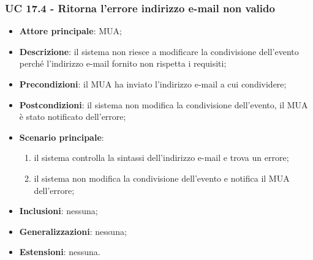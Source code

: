     \subsubsection{UC 17.4 - Ritorna l'errore indirizzo e-mail non valido} \label{sec:UC17.4}
    \begin{itemize}
        \item \textbf{Attore principale}: MUA;
        \item \textbf{Descrizione}: il sistema non riesce a modificare la condivisione dell'evento perché l'indirizzo e-mail fornito non rispetta i requisiti;
        \item \textbf{Precondizioni}: il MUA ha inviato l'indirizzo e-mail a cui condividere;
        \item \textbf{Postcondizioni}: il sistema non modifica la condivisione dell'evento, il MUA è stato notificato dell'errore;
        \item \textbf{Scenario principale}:
            \begin{enumerate}
                \item il sistema controlla la sintassi dell'indirizzo e-mail e trova un errore;
                \item il sistema non modifica la condivisione dell'evento e notifica il MUA dell'errore;
            \end{enumerate}
        \item \textbf{Inclusioni}: nessuna;
        \item \textbf{Generalizzazioni}: nessuna;
        \item \textbf{Estensioni}: nessuna.
    \end{itemize}
